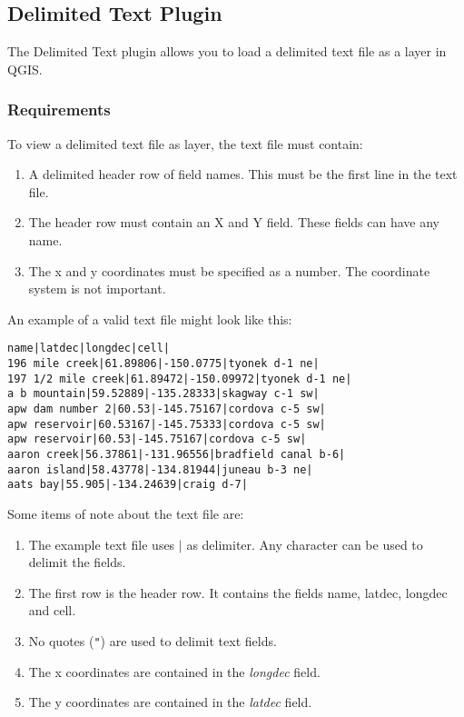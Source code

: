 \subsection{Delimited Text Plugin}\label{label_dltext}    

\updatedisclaimer

The Delimited Text plugin allows you to load a delimited text file as a layer in QGIS. 
    
\subsubsection{Requirements}

To view a delimited text file as layer, the text file must contain:

\begin{enumerate}      
\item A delimited header row of field names. This must be the first line in the text file.
\item The header row must contain an X and Y field. These fields can have any name.
\item The x and y coordinates must be specified as a number. The coordinate system is not important.
\end{enumerate}

An example of a valid text file might look like this:

\begin{verbatim} 
name|latdec|longdec|cell|
196 mile creek|61.89806|-150.0775|tyonek d-1 ne|
197 1/2 mile creek|61.89472|-150.09972|tyonek d-1 ne|
a b mountain|59.52889|-135.28333|skagway c-1 sw|
apw dam number 2|60.53|-145.75167|cordova c-5 sw|
apw reservoir|60.53167|-145.75333|cordova c-5 sw|
apw reservoir|60.53|-145.75167|cordova c-5 sw|
aaron creek|56.37861|-131.96556|bradfield canal b-6|
aaron island|58.43778|-134.81944|juneau b-3 ne|
aats bay|55.905|-134.24639|craig d-7|
\end{verbatim}


Some items of note about the text file are:

\begin{enumerate}        
\item  The example text file uses \mbox{$|$} as delimiter. Any character can be used to delimit the fields.
\item The first row is the header row. It contains the fields name, latdec, longdec and cell.
\item No quotes ({\tt{}"{}}) are used to delimit text fields.
\item The x coordinates are contained in the {\em longdec} field.
\item The y coordinates are contained in the {\em latdec} field.
\end{enumerate}

